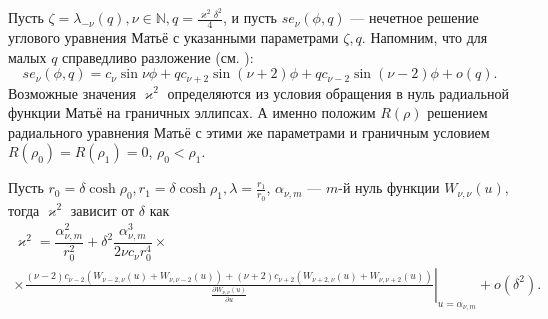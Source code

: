 Пусть $\zeta = \lambda_{-\nu}(q), \nu \in \mathbb{N}, q=\frac{\varkappa^2 \delta^2}{4}$, и пусть $se_\nu(\phi, q)$ --- нечетное решение углового уравнения Матьё с указанными параметрами $\zeta, q$.
Напомним, что для малых $q$ справедливо разложение (см. \cite[\S\ 2.2, с.~122--124]{wref12}):
$$se_\nu(\phi, q) = c_\nu \sin{\nu \phi} + q c_{\nu+2} \sin{(\nu+2) \phi} +q c_{\nu-2} \sin{(\nu-2) \phi} + o(q).$$ 
Возможные значения $\varkappa^2$ определяются из условия обращения в нуль радиальной функции Матьё на граничных эллипсах. А именно положим $R(\rho)$ решением радиального уравнения Матьё с этими же параметрами и граничным условием $R(\rho_0)=R(\rho_1)=0$, $\rho_0 < \rho_1$.
\begin{lemma}
Пусть $r_0 = \delta\cosh{\rho_0}, r_1 = \delta\cosh{\rho_1}, \lambda = \frac{r_1}{r_0}$, $\alpha_{\nu, m}$ --- $m$-й нуль функции $W_{\nu, \nu}(u)$, тогда $\varkappa^2$ зависит от $\delta$ как
{\small
\begin{multline*}
\varkappa^2 = \dfrac{\alpha_{\nu, m}^2}{r_0^2} + \delta^2 \dfrac{\alpha_{\nu, m}^3}{2 \nu c_\nu r_0^4} \times \\ \times \left. \frac{
	(\nu-2) c_{\nu-2}
	\left(
	W_{\nu-2, \nu}(u) + W_{\nu, \nu-2}(u)
	\right)+ 
    (\nu+2) c_{\nu+2}
	\left(
	W_{\nu+2, \nu}(u) + W_{\nu, \nu+2}(u)
	\right)
}{ \frac{\partial W_{\nu,\nu}(u)}{\partial u} }\right|_{u=\alpha_{\nu, m}} + o(\delta^2).
\end{multline*}
}
\label{th:ringLemma2}
\end{lemma}

